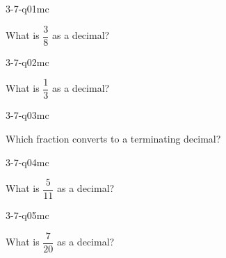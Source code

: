 

\begin{practiceQuestion}{3-7-q01}{mc}
\begin{questionText}
What is $\dfrac{3}{8}$ as a decimal?
\end{questionText}
\end{practiceQuestion}

\begin{practiceQuestion}{3-7-q02}{mc}
\begin{questionText}
What is $\dfrac{1}{3}$ as a decimal?
\end{questionText}
\end{practiceQuestion}

\begin{practiceQuestion}{3-7-q03}{mc}
\begin{questionText}
Which fraction converts to a terminating decimal?
\end{questionText}
\end{practiceQuestion}

\begin{practiceQuestion}{3-7-q04}{mc}
\begin{questionText}
What is $\dfrac{5}{11}$ as a decimal?
\end{questionText}
\end{practiceQuestion}

\begin{practiceQuestion}{3-7-q05}{mc}
\begin{questionText}
What is $\dfrac{7}{20}$ as a decimal?
\end{questionText}
\end{practiceQuestion}

